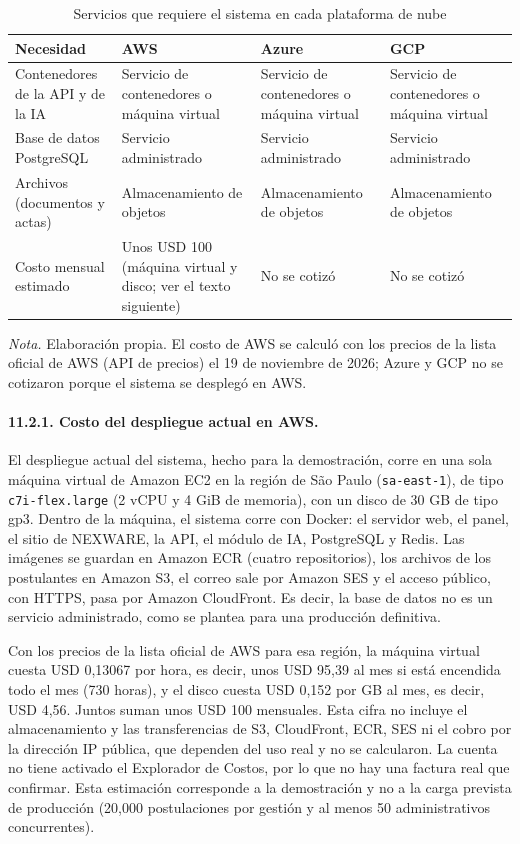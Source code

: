 \begin{table}[H]
\centering
\caption{Servicios que requiere el sistema en cada plataforma de nube}
\label{tab:nube}
\small
\begin{tabular}{@{}p{3.6cm}p{3.6cm}p{3.6cm}p{3.6cm}@{}}
\toprule
\textbf{Necesidad} & \textbf{AWS} & \textbf{Azure} & \textbf{GCP} \\
\midrule
Contenedores de la API y de la IA & Servicio de contenedores o máquina virtual & Servicio de contenedores o máquina virtual & Servicio de contenedores o máquina virtual \\
Base de datos PostgreSQL & Servicio administrado & Servicio administrado & Servicio administrado \\
Archivos (documentos y actas) & Almacenamiento de objetos & Almacenamiento de objetos & Almacenamiento de objetos \\
Costo mensual estimado & Unos USD 100 (máquina virtual y disco; ver el texto siguiente) & No se cotizó & No se cotizó \\
\bottomrule
\end{tabular}

\vspace{2pt}
\footnotesize\textit{Nota.} Elaboración propia. El costo de AWS se calculó con los precios de la lista oficial de AWS (API de precios) el 19 de noviembre de 2026; Azure y GCP no se cotizaron porque el sistema se desplegó en AWS.
\end{table}

\paragraph{11.2.1. Costo del despliegue actual en AWS.}

El despliegue actual del sistema, hecho para la demostración, corre en una sola máquina virtual de Amazon EC2 en la región de São Paulo (\texttt{sa-east-1}), de tipo \texttt{c7i-flex.large} (2 vCPU y 4 GiB de memoria), con un disco de 30 GB de tipo gp3. Dentro de la máquina, el sistema corre con Docker: el servidor web, el panel, el sitio de NEXWARE, la API, el módulo de IA, PostgreSQL y Redis. Las imágenes se guardan en Amazon ECR (cuatro repositorios), los archivos de los postulantes en Amazon S3, el correo sale por Amazon SES y el acceso público, con HTTPS, pasa por Amazon CloudFront. Es decir, la base de datos no es un servicio administrado, como se plantea para una producción definitiva.

Con los precios de la lista oficial de AWS para esa región, la máquina virtual cuesta USD 0,13067 por hora, es decir, unos USD 95,39 al mes si está encendida todo el mes (730 horas), y el disco cuesta USD 0,152 por GB al mes, es decir, USD 4,56. Juntos suman unos USD 100 mensuales. Esta cifra no incluye el almacenamiento y las transferencias de S3, CloudFront, ECR, SES ni el cobro por la dirección IP pública, que dependen del uso real y no se calcularon. La cuenta no tiene activado el Explorador de Costos, por lo que no hay una factura real que confirmar. Esta estimación corresponde a la demostración y no a la carga prevista de producción (20,000 postulaciones por gestión y al menos 50 administrativos concurrentes).

